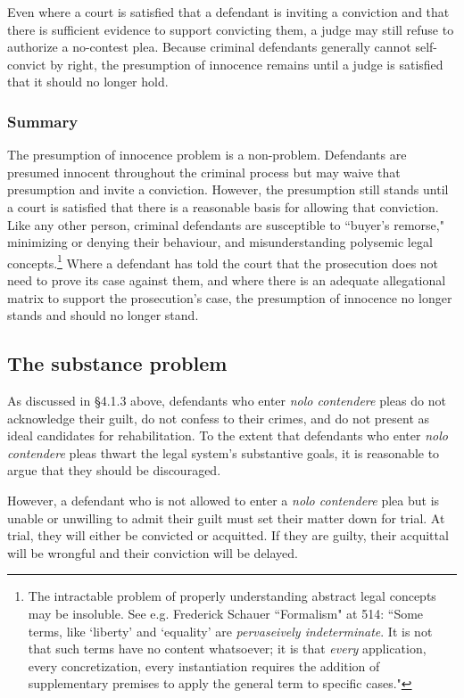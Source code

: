 Even where a court is satisfied that a defendant is inviting a conviction and that there is sufficient evidence to support convicting them, a judge may still refuse to authorize a no-contest plea. Because criminal defendants generally cannot self-convict by right, the presumption of innocence remains until a judge is satisfied that it should no longer hold.

\subsubsection{Summary}

The presumption of innocence problem is a non-problem. Defendants are presumed innocent throughout the criminal process but may waive that presumption and invite a conviction. However, the presumption still stands until a court is satisfied that there is a reasonable basis for allowing that conviction. Like any other person, criminal defendants are susceptible to ``buyer's remorse," minimizing or denying their behaviour, and  misunderstanding polysemic legal concepts.\footnote{The intractable problem of properly understanding abstract legal concepts may be insoluble. See e.g. Frederick Schauer ``Formalism" at 514: ``Some terms, like `liberty' and `equality' are \textit{pervaseively indeterminate}. It is not that such terms have no content whatsoever; it is that \textit{every} application, every concretization, every instantiation requires the addition of supplementary premises to apply the general term to specific cases."} Where a defendant has told the court that the prosecution does not need to prove its case against them, and where there is an adequate allegational matrix to support the prosecution's case, the presumption of innocence no longer stands and should no longer stand.

\subsection{The substance problem}

As discussed in \S 4.1.3 above, defendants who enter \textit{nolo contendere} pleas do not acknowledge their guilt, do not confess to their crimes, and do not present as ideal candidates for rehabilitation. To the extent that defendants who enter \textit{nolo contendere} pleas thwart the legal system's substantive goals, it is reasonable to argue that they should be discouraged.

However, a defendant who is not allowed to enter a \textit{nolo contendere} plea but is unable or unwilling to admit their guilt must set their matter down for trial. At trial, they will either be convicted or acquitted. If they are guilty, their acquittal will be wrongful and their conviction will be delayed.

